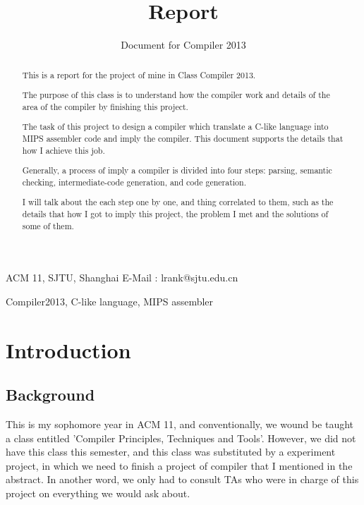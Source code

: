 \documentclass[preprint, 9pt]{sigplanconf}
\begin{document}
\copyrightdata{}

\titlebanner{}

\title{Report}
\subtitle{Document for Compiler 2013}

           {ACM 11, SJTU, Shanghai}
           {E-Mail : lrank@sjtu.edu.cn}

\maketitle

\begin{abstract}
    This is a report for the project of mine in Class Compiler 2013.

    The purpose of this class is to understand how the compiler work and details of the area of the compiler by finishing this project.

    The task of this project to design a compiler which translate a C-like language into MIPS assembler code and imply the compiler.
    This document supports the details that how I achieve this job.

    Generally, a process of imply a compiler is divided into four steps: parsing, semantic checking, intermediate-code generation, and code generation.

    I will talk about the each step one by one, and thing correlated to them, such as the details that how I got to imply this project, the problem I met and the solutions of some of them.

\end{abstract}

\keywords
Compiler2013, C-like language, MIPS assembler

\section{Introduction}

    \subsection{Background}
    This is my sophomore year in ACM 11, and conventionally, we wound be taught a class entitled 'Compiler Principles, Techniques and Tools'.
    However, we did not have this class this semester, and this class was substituted by a experiment project, in which we need to finish a project of compiler that I mentioned in the abstract.
    In another word, we only had to consult TAs who were in charge of this project on everything we would ask about.
\end{document}
